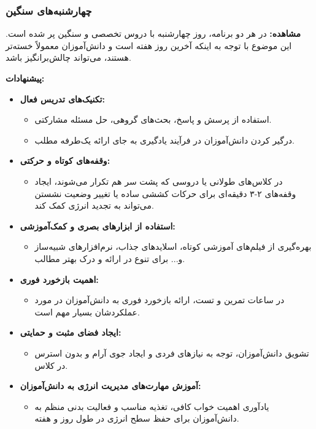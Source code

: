\documentclass[a4paper,14pt]{article}
\begin{document}
\subsubsection*{چهارشنبه‌های سنگین}
\textbf{مشاهده:} در هر دو برنامه، روز چهارشنبه با دروس تخصصی و سنگین پر شده است. این موضوع با توجه به اینکه آخرین روز هفته است و دانش‌آموزان معمولاً خسته‌تر هستند، می‌تواند چالش‌برانگیز باشد.

\textbf{پیشنهادات:}
\begin{itemize}
    \item \textbf{تکنیک‌های تدریس فعال:}
        \begin{itemize}
            \item استفاده از پرسش و پاسخ، بحث‌های گروهی، حل مسئله مشارکتی.
            \item درگیر کردن دانش‌آموزان در فرآیند یادگیری به جای ارائه یک‌طرفه مطلب.
        \end{itemize}
    \item \textbf{وقفه‌های کوتاه و حرکتی:}
        \begin{itemize}
            \item در کلاس‌های طولانی یا دروسی که پشت سر هم تکرار می‌شوند، ایجاد وقفه‌های ۲-۳ دقیقه‌ای برای حرکات کششی ساده یا تغییر وضعیت نشستن می‌تواند به تجدید انرژی کمک کند.
        \end{itemize}
    \item \textbf{استفاده از ابزارهای بصری و کمک‌آموزشی:}
        \begin{itemize}
            \item بهره‌گیری از فیلم‌های آموزشی کوتاه، اسلایدهای جذاب، نرم‌افزارهای شبیه‌ساز و... برای تنوع در ارائه و درک بهتر مطالب.
        \end{itemize}
    \item \textbf{اهمیت بازخورد فوری:}
        \begin{itemize}
            \item در ساعات تمرین و تست، ارائه بازخورد فوری به دانش‌آموزان در مورد عملکردشان بسیار مهم است.
        \end{itemize}
    \item \textbf{ایجاد فضای مثبت و حمایتی:}
        \begin{itemize}
            \item تشویق دانش‌آموزان، توجه به نیازهای فردی و ایجاد جوی آرام و بدون استرس در کلاس.
        \end{itemize}
    \item \textbf{آموزش مهارت‌های مدیریت انرژی به دانش‌آموزان:}
        \begin{itemize}
            \item یادآوری اهمیت خواب کافی، تغذیه مناسب و فعالیت بدنی منظم به دانش‌آموزان برای حفظ سطح انرژی در طول روز و هفته.
        \end{itemize}
\end{itemize}
\bigskip
\end{document}
